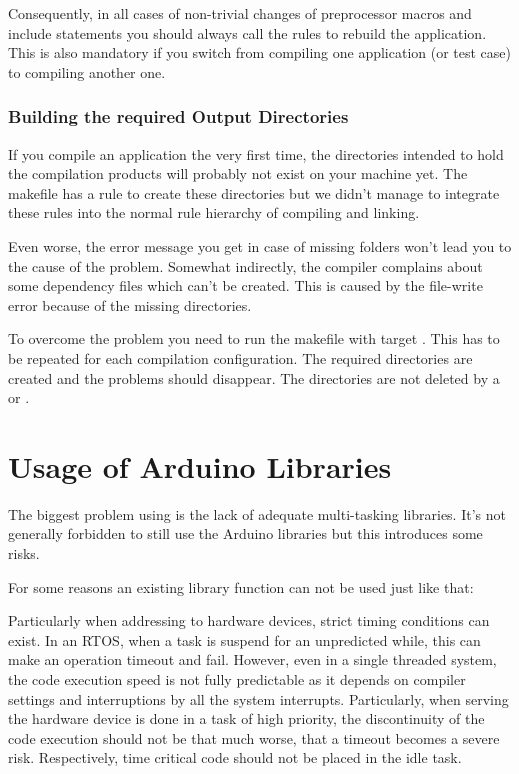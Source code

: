 Consequently, in all cases of non-trivial changes of preprocessor macros
and include statements you should always call the rules to rebuild the
application. This is also mandatory if you switch from compiling one
\rtos{} application (or test case) to compiling another one.


\subsubsection{Building the required Output Directories}

If you compile an \rtos{} application the very first time, the directories
intended to hold the compilation products will probably not exist on your
machine yet. The makefile has a rule to create these directories but we
didn't manage to integrate these rules into the normal rule hierarchy of
compiling and linking.

Even worse, the error message you get in case of missing folders won't
lead you to the cause of the problem. Somewhat indirectly, the compiler
complains about some dependency files which can't be created. This is
caused by the file-write error because of the missing directories.

To overcome the problem you need to run the makefile with target
. This has to be repeated for each compilation
configuration. The required directories are created and the problems
should disappear. The directories are not deleted by a  or
.


\section{Usage of Arduino Libraries}

The biggest problem using \rtos{} is the lack of adequate multi-tasking
libraries. It's not generally forbidden to still use the Arduino libraries
but this introduces some risks. 

For some reasons an existing library function can not be used just like
that:

Particularly when addressing to hardware devices, strict timing conditions
can exist. In an RTOS, when a task is suspend for an unpredicted while,
this can make an operation timeout and fail. However, even in a single
threaded system, the code execution speed is not fully predictable as it
depends on compiler settings and interruptions by all the system
interrupts. Particularly, when serving the hardware device is done in a
task of high priority, the discontinuity of the code execution should not
be that much worse, that a timeout becomes a severe risk. Respectively,
time critical code should not be placed in the idle task.

